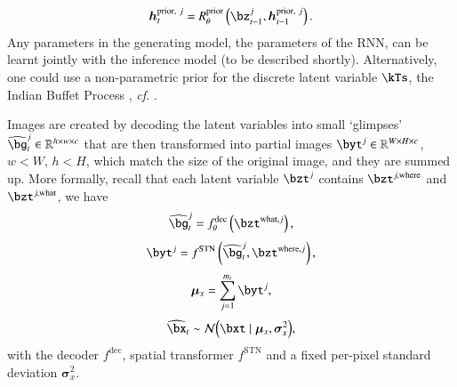 \begin{equation}
    \bm{h}_t^{\mathrm{prior},\ j} = R_\theta^\mathrm{prior} \left( \bz_{t-1}^j, \bm{h}_{t-1}^{\mathrm{prior},\ j} \right).
\end{equation}
Any parameters in the generating model, \eg the parameters of the RNN, can be learnt jointly with the inference model (to be described shortly).
Alternatively, one could use a non-parametric prior for the discrete latent variable $\kTs$, \eg the Indian Buffet Process \citep{Gael2009}, \emph{cf.} . 

Images are created by decoding the latent variables into small `glimpses' $\widehat{\bg}_t^j \in \RR^{h \times w \times c}$ that are then transformed into partial images $\byt^j \in \RR^{W \times H \times c}$, $w < W$, $h < H$, which match the size of the original image, and they are summed up. More formally, recall that each latent variable $\bzt^j$ contains $\bzt^{j, \mathrm{where}}$ and  $\bzt^{j, \mathrm{what}}$, we have
\begin{equation}
    \widehat{\bg}_t^j = f^{\mathrm{dec}}_\theta \left( \bzt^{\mathrm{what}, j} \right),
\end{equation}
\begin{equation}
    \byt^j = f^{\mathrm{STN}} \left( \widehat{\bg}_t^j, \bzt^{\mathrm{where}, j} \right),
\end{equation}
\begin{equation}
    \bm{\mu}_x = \sum_{j=1}^{m_t} \byt^j,
\end{equation}
\begin{equation}
    \widehat{\bx}_t \sim \gauss{ \bxt \mid \bm{\mu}_x, \bm{\sigma}_x^2},
\end{equation}
with the decoder $f^{\mathrm{dec}}$, spatial transformer $f^{\mathrm{STN}}$ and a fixed per-pixel standard deviation $\bm{\sigma}_x^2$.

